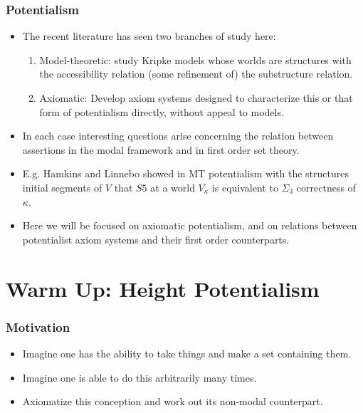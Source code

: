 \documentclass{beamer}
\begin{document}
\begin{frame}
\frametitle{Potentialism}
    \begin{itemize}
        \item The recent literature has seen two branches of study here:
        \begin{enumerate}
            \item<2->   Model-theoretic: study Kripke models whose worlds are 
                        structures with the accessibility relation (some refinement of)
                        the substructure relation.
            \item<3->   Axiomatic: Develop axiom systems designed to characterize 
                        this or that form of potentialism directly, without appeal to models.
        \end{enumerate}
        \item<4->   In each case interesting questions arise concerning the relation 
                    between assertions in the modal framework and in first order set theory.
        \item<5->   E.g. Hamkins and Linnebo showed in MT potentialism with the structures
                    initial segments of $V$ that $S5$ at a world $V_\kappa$ is equivalent 
                    to $\Sigma_3$ correctness of $\kappa$.
        \item<6->   Here we will be focused on axiomatic potentialism, and on 
                    relations between potentialist axiom systems and their first order counterparts.
    \end{itemize}
    
\end{frame}

\section{Warm Up: Height Potentialism}

\begin{frame}
    \frametitle{Motivation}
    \begin{itemize}
        \item<2->   Imagine one has the ability to take things and 
                    make a set containing them.
        \item<3->   Imagine one is able to do this arbitrarily many times.
        \item<4->   Axiomatize this conception and work out its non-modal counterpart.
    \end{itemize}
\end{frame}
\end{document}
